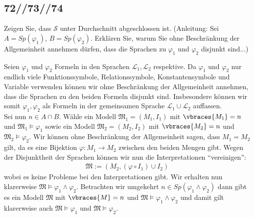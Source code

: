 \subsection*{72//73//74}

\begin{exercise}[72]

\phantom{}
	Zeigen Sie, dass $\mathscr{S}$ unter Durchschnitt abgeschlossen ist. (Anleitung: Sei $A = Sp(\varphi_1)$, $B = Sp(\varphi_2)$. Erklären Sie, warum Sie ohne Beschränkung der Allgemeinheit annehmen dürfen, dass die Sprachen zu $\varphi_1$ und $\varphi_2$ disjunkt sind...)

\end{exercise}


\begin{solution}

\phantom{}
	Seien $\varphi_1$ und $\varphi_2$ Formeln in den Sprachen $\mathcal{L}_1, \mathcal{L}_2$
	respektive.
	Da $\varphi_1$ und $\varphi_2$ nur endlich viele Funktionssymbole, Relationssymbole,
	Konstantensymbole und Variable verwenden können wir ohne Beschränkung der Allgemeinheit
	annehmen, dass die Sprachen zu den beiden Formeln disjunkt sind.\newline
	Insbesondere können wir somit $\varphi_1,\varphi_2$ als Formeln in der gemeinsamen Sprache
	$\mathcal{L}_1 \cup \mathcal{L}_2$ auffassen. \\
	Sei nun $n \in A \cap B$. Wähle ein Modell $\mathfrak{M}_1 = (M_1,I_1)$ mit
	$\vbraces{M_1} = n$ und $\mathfrak{M}_1 \vDash \varphi_1$ sowie ein Modell
	$\mathfrak{M}_2 = (M_2,I_2)$
	mit $\vbraces{M_2} = n$ und $\mathfrak{M}_2 \vDash \varphi_2$.
	Wir können ohne Beschränkung der Allgemeinheit sagen, dass $M_1 = M_2$ gilt,
	da es eine Bijektion $\varphi: M_1 \to M_2$ zwischen den beiden Mengen gibt.
	Wegen der Disjunktheit der Sprachen können wir nun die Interpretationen \enquote{vereinigen}:
	\begin{align*}
	\mathfrak{M} := (M_2, (\varphi\circ I_1) \cup I_2)
	\end{align*}
	wobei es keine Probleme bei den Interpretationen gibt. Wir erhalten nun klarerweise $\mathfrak{M} \vDash \varphi_1 \land \varphi_2$.  \newline
	Betrachten wir umgekehrt $n \in Sp(\varphi_1 \land \varphi_2)$ dann gibt es ein Modell $\mathfrak{M}$ mit $\vbraces{M} = n$ und $\mathfrak{M} \vDash \varphi_1 \land \varphi_2$ und damit gilt klarerweise auch $\mathfrak{M} \vDash \varphi_1$ und $\mathfrak{M} \vDash \varphi_2$.
\end{solution}

